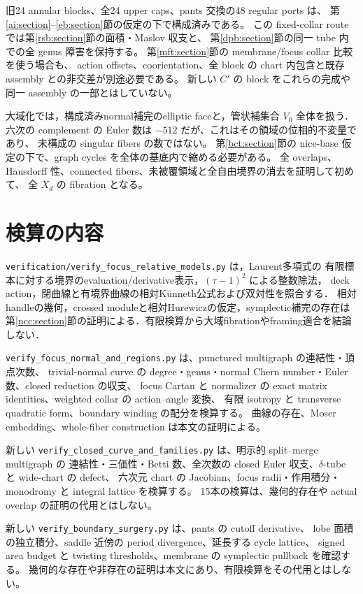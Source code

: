 \documentclass[11pt,a4paper]{article}
\theoremstyle{definition}
\begin{document}
旧24 annular blocks、全24 upper caps、pants 交換の48 regular ports は、
第\ref{ai:section}--\ref{eb:section}節の仮定の下で構成済みである。
この fixed-collar route では第\ref{rsb:section}節の面積・Maslov 収支と、
第\ref{dpb:section}節の同一 tube 内での全 genus 障害を保持する。
第\ref{mft:section}節の membrane/focus collar 比較を使う場合も、
action offsets、coorientation、全 block の chart 内包含と既存 assembly との非交差が別途必要である。
新しい $C'$ の block をこれらの完成や同一 assembly の一部とはしていない。

大域化では，構成済みnormal補完のelliptic faceと，管状補集合 $V_0$ 全体を扱う．
六次の complement の Euler 数は $-512$ だが、これはその領域の位相的不変量であり、
未構成の singular fibers の数ではない。
第\ref{bct:section}節の nice-base 仮定の下で、graph cycles を全体の基底内で縮める必要がある。
全 overlaps、Hausdorff 性、connected fibers、未被覆領域と全自由境界の消去を証明して初めて、
全 $X_d$ の fibration となる。

\appendix
\section{検算の内容}

\texttt{verification/verify\_focus\_relative\_models.py} は，Laurent多項式の
有限標本に対する境界のevaluation/derivative表示，$(\tau-1)^2$ による整数除法，
deck action，閉曲線と有境界曲線の相対K\"unneth公式および双対性を照合する．
相対handleの幾何，crossed moduleと相対Hurewiczの仮定，symplectic補完の存在は
第\ref{ncc:section}節の証明による．有限検算から大域fibrationやframing適合を結論しない．


\texttt{verify\_focus\_normal\_and\_regions.py} は、punctured multigraph の連結性・頂点次数、
trivial-normal curve の degree・genus・normal Chern number・Euler 数、closed reduction の収支、
focus Cartan と normalizer の exact matrix identities、weighted collar の action--angle 変換、
有限 isotropy と transverse quadratic form、boundary winding の配分を検算する。
曲線の存在、Moser embedding、whole-fiber construction は本文の証明による。

新しい \texttt{verify\_closed\_curve\_and\_families.py} は、明示的 split--merge multigraph の
連結性・三価性・Betti 数、全次数の closed Euler 収支、$\delta$-tube と wide-chart の defect、
六次元 chart の Jacobian、focus radii・作用積分・monodromy と integral lattice を検算する。
15本の検算は、幾何的存在や actual overlap の証明の代用とはしない。


新しい \texttt{verify\_boundary\_surgery.py} は、pants の cutoff derivative、
lobe 面積の独立積分、saddle 近傍の period divergence、延長する cycle lattice、
signed area budget と twisting thresholds、membrane の symplectic pullback を確認する。
幾何的な存在や非存在の証明は本文にあり、有限検算をその代用とはしない。
\end{document}
